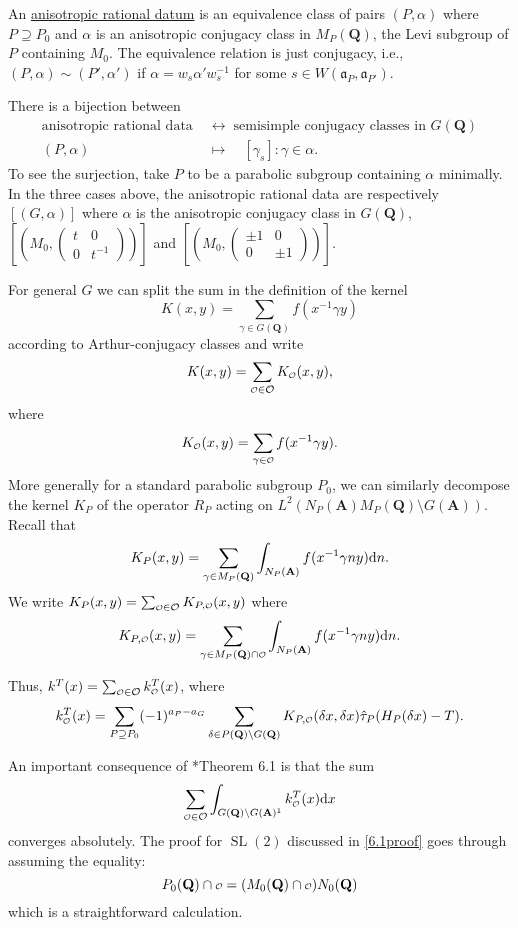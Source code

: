 \documentclass[11pt]{amsart}
\def\apg{a_{P} - a_{G}}
\def\A{\mathbf A}
\def\Q{\mathbf Q}
\def\O{\mathcal O}
\def\o{\scalebox{0.8}{$\scriptstyle\mathcal{O}$}}
\def\aaa{\mathfrak a}
\def\d{\text d}
\def\bs{\setminus}
\def\Ltwo{L^2}
\def\sl{\operatorname{SL}}
\theoremstyle{remark}
\begin{document}
An \underline{anisotropic rational datum} is an equivalence class of pairs $(P, \alpha)$ where $P \supseteq P_0$ and $\alpha$ is an anisotropic conjugacy class in $M_P(\Q)$, the Levi subgroup of $P$ containing $M_0$. The equivalence relation is just conjugacy, i.e., $(P, \alpha) \sim (P', \alpha')$ if $\alpha = w_s \alpha' w_s^{-1}$ for some $s \in W(\aaa_P, \aaa_{P'})$. 

There is a bijection between 
\begin{align*}
	\text{anisotropic rational data} \; & \leftrightarrow \; \text{semisimple conjugacy classes in } G(\Q) \\
	(P, \alpha) \quad & \mapsto \quad [\gamma_s] : \gamma \in \alpha.
\end{align*}
To see the surjection, take $P$ to be a parabolic subgroup containing $\alpha$ minimally. In the three cases above, the anisotropic rational data are respectively $[(G, \alpha)]$ where $\alpha$ is the anisotropic conjugacy class in $G(\Q)$, $\left[ \left(M_0, \begin{pmatrix} t & 0 \\ 0 & t^{-1} \end{pmatrix} \right) \right]$ and $\left[ \left(M_0, \begin{pmatrix} \pm 1 & 0 \\ 0 & \pm 1 \end{pmatrix} \right)\right]$.

For general $G$ we can split the sum in the definition of the kernel
\[ K(x, y) = \sum_{\gamma \in G(\Q)} f(x^{-1} \gamma y) \]
according to Arthur-conjugacy classes and write
\[ K(x, y) = \sum_{\o \in \O} K_{\o}(x, y),\]
where
\[ K_{\o}(x, y) = \sum_{\gamma \in \o} f(x^{-1}\gamma y). \]
More generally for a standard parabolic subgroup $P_0$, we can similarly decompose the kernel $K_P$ of the operator $R_P$ acting on $\Ltwo(N_P(\A) M_P(\Q) \bs G(\A))$. Recall that
\[ K_P(x, y) = \sum_{\gamma \in M_P(\Q)} \int_{N_P(\A)} f(x^{-1} \gamma n y) \d n. \]
We write $K_P(x, y) = \sum_{\o \in \O} K_{P, \o} (x, y)$ where
\[ K_{P, \o}(x, y) = \sum_{\gamma \in M_P(\Q) \cap \o} \int_{N_P(\A)} f(x^{-1} \gamma n y) \d n. \]

Thus, $k^T(x) = \sum_{\o \in \O} k^T_{\o}(x)$, where
\[ k^T_{\o}(x) = \sum_{P \supseteq P_0} (-1)^{\apg} \sum_{\delta\in P(\Q)\bs G(\Q)} K_{P, \o}(\delta x, \delta x) \hat\tau_P(H_P(\delta x) - T). \]

An important consequence of \cite{clay}*{Theorem 6.1} is that the sum 
\begin{equation}
	\sum_{\o \in \O} \int_{G(\Q) \bs G(\A)^1} k_{\o}^T(x) \d x 
\end{equation}
converges absolutely. The proof for $\sl(2)$ discussed in \cref{6.1proof} goes through assuming the equality:
\[ P_0(\Q) \cap \o = (M_0(\Q) \cap \o) N_0(\Q) \]
which is a straightforward calculation.
\end{document}
